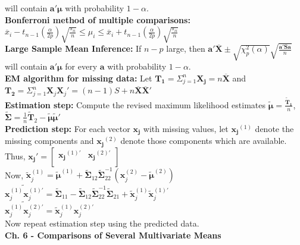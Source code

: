 \documentclass[5pt,twocolumn]{article}
\begin{document}
	\indent will contain $\mathbf{a'\mu}$ with probability $1 - \alpha$.\\
	\textbf{Bonferroni method of multiple comparisons:}\\
	\indent $\overline{x}_i - t_{n-1}\left(\frac{\alpha}{2p}\right)\sqrt{\frac{s_{ii}}{n}} \leq \mu_i \leq \overline{x}_i + t_{n-1}\left(\frac{\alpha}{2p}\right)\sqrt{\frac{s_{ii}}{n}}$\\
	\textbf{Large Sample Mean Inference:} If $n-p$ large, then $\mathbf{a'\overline{X}} \pm \sqrt{\chi_p^2(\alpha)}\sqrt{\frac{\mathbf{a'Sa}}{n}}$  will contain $\mathbf{a'\mu}$ for every $\mathbf{a}$ with probability $1 - \alpha$.\\
	\textbf{EM algorithm for missing data:} Let $\mathbf{T_1} = \Sigma_{j=1}^n \mathbf{X_j} = n\mathbf{\overline{X}}$ and $\mathbf{T_2} = \Sigma_{j=1}^n \mathbf{X}_j \mathbf{X}_j' = (n-1)S + n \mathbf{\overline{X}\overline{X}}'$\\
	\indent \textbf{Estimation step:} Compute the revised maximum likelihood estimates $\mathbf{\tilde{\mu}} = \frac{\mathbf{\widetilde{T}_1}}{n}$, $\mathbf{\tilde{\Sigma}} = \frac{1}{n}\widetilde{\mathbf{T}}_2 - \mathbf{\tilde{\mu}}\mathbf{\tilde{\mu}'}$\\
	\indent \textbf{Prediction step:} For each vector $\mathbf{x_j}$ with missing values, let $\mathbf{x_j}^{(1)}$ denote the missing components and $\mathbf{x_j}^{(2)}$ denote those components which are available. Thus, $\mathbf{x_j}' = \begin{bmatrix}
\mathbf{x_j}^{(1)'} & \mathbf{x_j}^{(2)'}\\
\end{bmatrix}$\\
	\indent Now, $\mathbf{\tilde{x}}_j^{(1)} = \mathbf{\tilde{\mu}}^{(1)} + \mathbf{\tilde{\Sigma}}_{12}\mathbf{\tilde{\Sigma}}_{22}^{-1}(\mathbf{x}_j^{(2)} - \mathbf{\tilde{\mu}}^{(2)})$\\
	\indent $\widetilde{\mathbf{x}_j^{(1)}\mathbf{x}_j^{(1)'}} = \mathbf{\tilde{\Sigma}}_{11} - \mathbf{\tilde{\Sigma}}_{12}\mathbf{\tilde{\Sigma}}_{22}^{-1}\mathbf{\tilde{\Sigma}}_{21} + \mathbf{\tilde{x}}_j^{(1)}\mathbf{\tilde{x}}_j^{(1)'}$\\
	\indent $\widetilde{\mathbf{x}_j^{(1)}\mathbf{x}_j^{(2)'}} = \mathbf{\tilde{x}}_j^{(1)}\mathbf{x}_j^{(2)'}$\\
	Now repeat estimation step using the predicted data.\\
	\noindent \textbf{Ch. 6 - Comparisons of Several Multivariate Means}\\
\end{document}
